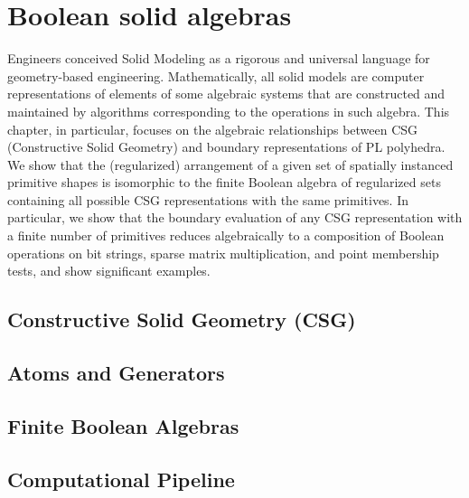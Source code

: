 
\chapter{Boolean solid algebras}
\label{chapt:8}

Engineers conceived Solid Modeling as a rigorous and universal language for geometry-based engineering. Mathematically, all solid models are computer representations of elements of some algebraic systems that are constructed and maintained by algorithms corresponding to the operations in such algebra.
This chapter, in particular, focuses on the algebraic relationships between CSG (Constructive Solid Geometry) and boundary representations of PL polyhedra. We show that the (regularized) arrangement of a given set of spatially instanced primitive shapes is isomorphic to the finite Boolean algebra of regularized sets containing all possible CSG representations with the same primitives.
In particular, we show that the boundary evaluation of any CSG representation with a finite number of primitives reduces algebraically to a composition of Boolean operations on bit strings, sparse matrix multiplication, and point membership tests, and show significant examples.

 

\section{Constructive Solid Geometry (CSG)}\label{sect:8-1}


\section{Atoms and Generators }\label{sect:8-2}


\section{Finite Boolean Algebras}\label{sect:8-3}


\section{Computational Pipeline}\label{sect:8-4}


